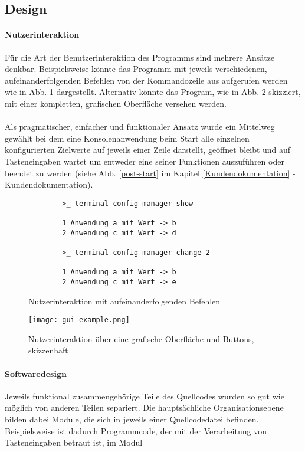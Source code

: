 \subsection{Design}
\paragraph{Nutzerinteraktion}
Für die Art der Benutzerinteraktion des Programms sind mehrere Ansätze denkbar.
Beispielsweise könnte das Programm mit jeweils verschiedenen, aufeinanderfolgenden
Befehlen von der Kommandozeile aus aufgerufen werden wie in Abb. \ref{simple-gui-example}
dargestellt. Alternativ könnte das Program, wie in Abb. \ref{graphical-gui-example} skizziert,
mit einer kompletten, grafischen Oberfläche versehen werden.

\paragraph{}
Als pragmatischer, einfacher und funktionaler Ansatz wurde ein Mittelweg gewählt
bei dem eine Konsolenanwendung beim Start alle einzelnen konfigurierten
Zielwerte auf jeweils einer Zeile darstellt, geöffnet bleibt und auf Tasteneingaben
wartet um entweder eine seiner Funktionen auszuführen oder beendet zu werden (siehe Abb. \ref{post-start}
im Kapitel \ref{Kundendokumentation} - Kundendokumentation).


\begin{figure}
    \caption{Nutzerinteraktion mit aufeinanderfolgenden Befehlen}
    \label{simple-gui-example}
    \begin{verbatim}
        >_ terminal-config-manager show
    
        1 Anwendung a mit Wert -> b
        2 Anwendung c mit Wert -> d
    
        >_ terminal-config-manager change 2
    
        1 Anwendung a mit Wert -> b
        2 Anwendung c mit Wert -> e
    \end{verbatim}
\end{figure}

\begin{figure}
    \caption{Nutzerinteraktion über eine grafische Oberfläche und Buttons, skizzenhaft}
    \label{graphical-gui-example}
    \centering\texttt{[image: gui-example.png]}
\end{figure}

\paragraph{Softwaredesign} \label{par:softwaredesign}
Jeweils funktional zusammengehörige Teile des Quellcodes wurden so gut wie möglich
von anderen Teilen separiert. Die hauptsächliche Organisationsebene bilden dabei
Module, die sich in jeweils einer Quellcodedatei befinden. Beispielsweise ist dadurch
Programmcode, der mit der Verarbeitung von Tasteneingaben betraut ist, im Modul

